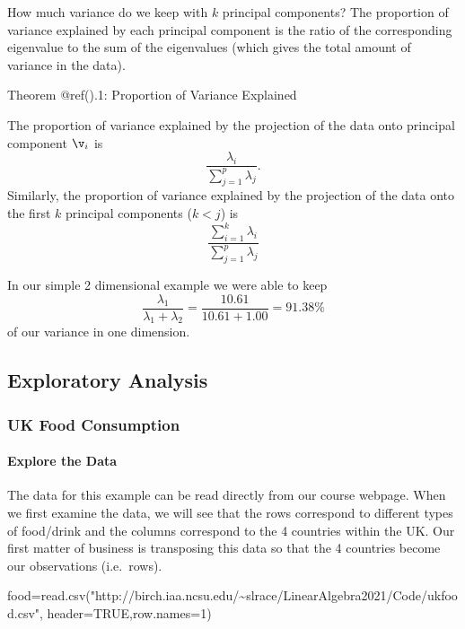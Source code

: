 \documentclass[
]{article}
\newenvironment{Shaded}{\begin{snugshade}}{\end{snugshade}}
\newcommand{\AttributeTok}[1]{\textcolor[rgb]{0.77,0.63,0.00}{#1}}
\newcommand{\ConstantTok}[1]{\textcolor[rgb]{0.00,0.00,0.00}{#1}}
\newcommand{\DecValTok}[1]{\textcolor[rgb]{0.00,0.00,0.81}{#1}}
\newcommand{\FunctionTok}[1]{\textcolor[rgb]{0.00,0.00,0.00}{#1}}
\newcommand{\NormalTok}[1]{#1}
\newcommand{\OtherTok}[1]{\textcolor[rgb]{0.56,0.35,0.01}{#1}}
\newcommand{\StringTok}[1]{\textcolor[rgb]{0.31,0.60,0.02}{#1}}
\theoremstyle{definition}
\theoremstyle{definition}
\theoremstyle{definition}
\theoremstyle{definition}
\theoremstyle{remark}
\begin{document}
How much variance do we keep with \(k\) principal components? The proportion of variance explained by each principal component is the ratio of the corresponding eigenvalue to the sum of the eigenvalues (which gives the total amount of variance in the data).

Theorem @ref().1: Proportion of Variance Explained

The proportion of variance explained by the projection of the data onto principal component \(\v_i\) is
\[\frac{\lambda_i}{\sum_{j=1}^p \lambda_j}.\]
Similarly, the proportion of variance explained by the projection of the data onto the first \(k\) principal components (\(k<j\)) is
\[ \frac{\sum_{i=1}^k\lambda_i}{\sum_{j=1}^p \lambda_j}\]

In our simple 2 dimensional example we were able to keep
\[\frac{\lambda_1}{\lambda_1+\lambda_2}=\frac{10.61}{10.61+1.00} = 91.38\%\]
of our variance in one dimension.

\hypertarget{exploratory-analysis}{%
\subsection{Exploratory Analysis}\label{exploratory-analysis}}

\hypertarget{uk-food-consumption}{%
\subsubsection{UK Food Consumption}\label{uk-food-consumption}}

\hypertarget{explore-the-data}{%
\paragraph{Explore the Data}\label{explore-the-data}}

The data for this example can be read directly from our course webpage. When we first examine the data, we will see that the rows correspond to different types of food/drink and the columns correspond to the 4 countries within the UK. Our first matter of business is transposing this data so that the 4 countries become our observations (i.e.~rows).

\begin{Shaded}
\begin{Highlighting}[]
\NormalTok{food}\OtherTok{=}\FunctionTok{read.csv}\NormalTok{(}\StringTok{"http://birch.iaa.ncsu.edu/\textasciitilde{}slrace/LinearAlgebra2021/Code/ukfood.csv"}\NormalTok{,}
              \AttributeTok{header=}\ConstantTok{TRUE}\NormalTok{,}\AttributeTok{row.names=}\DecValTok{1}\NormalTok{)}
\end{Highlighting}
\end{Shaded}
\end{document}
